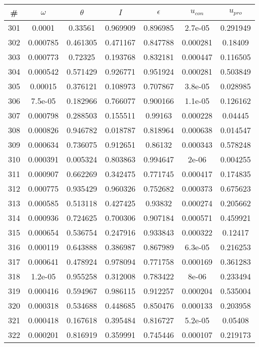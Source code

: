 \newpage
\begin{table}
\begin{tabular}{c|c|c|c|c|c|c}
\# & $\omega$ & $\theta$ & $I$ & $\epsilon$ & $u_{con}$ & $u_{pro}$\\
\hline
301 & 0.0001 & 0.33561 & 0.969909 & 0.896985 & 2.7e-05 & 0.291949\\
302 & 0.000785 & 0.461305 & 0.471167 & 0.847788 & 0.000281 & 0.18409\\
303 & 0.000773 & 0.72325 & 0.193768 & 0.832181 & 0.000447 & 0.116505\\
304 & 0.000542 & 0.571429 & 0.926771 & 0.951924 & 0.000281 & 0.503849\\
305 & 0.00015 & 0.376121 & 0.108973 & 0.707867 & 3.8e-05 & 0.028985\\
306 & 7.5e-05 & 0.182966 & 0.766077 & 0.900166 & 1.1e-05 & 0.126162\\
307 & 0.000798 & 0.288503 & 0.155511 & 0.99163 & 0.000228 & 0.04445\\
308 & 0.000826 & 0.946782 & 0.018787 & 0.818964 & 0.000638 & 0.014547\\
309 & 0.000634 & 0.736075 & 0.912651 & 0.86132 & 0.000343 & 0.578248\\
310 & 0.000391 & 0.005324 & 0.803863 & 0.994647 & 2e-06 & 0.004255\\
311 & 0.000907 & 0.662269 & 0.342475 & 0.771745 & 0.000417 & 0.174835\\
312 & 0.000775 & 0.935429 & 0.960326 & 0.752682 & 0.000373 & 0.675623\\
313 & 0.000585 & 0.513118 & 0.427425 & 0.93832 & 0.000274 & 0.205662\\
314 & 0.000936 & 0.724625 & 0.700306 & 0.907184 & 0.000571 & 0.459921\\
315 & 0.000654 & 0.536754 & 0.247916 & 0.933843 & 0.000322 & 0.12417\\
316 & 0.000119 & 0.643888 & 0.386987 & 0.867989 & 6.3e-05 & 0.216253\\
317 & 0.000641 & 0.478924 & 0.978094 & 0.771758 & 0.000169 & 0.361283\\
318 & 1.2e-05 & 0.955258 & 0.312008 & 0.783422 & 8e-06 & 0.233494\\
319 & 0.000416 & 0.594967 & 0.986115 & 0.912257 & 0.000204 & 0.535004\\
320 & 0.000318 & 0.534688 & 0.448685 & 0.850476 & 0.000133 & 0.203958\\
321 & 0.000418 & 0.167618 & 0.395484 & 0.816727 & 5.2e-05 & 0.05408\\
322 & 0.000201 & 0.816919 & 0.359991 & 0.745446 & 0.000107 & 0.219173\\

\end{tabular}
\end{table}
